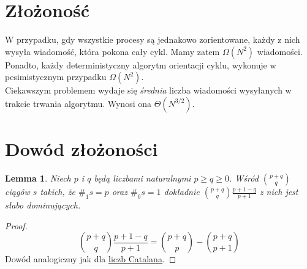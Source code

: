 \documentclass{article}
\newtheorem{lemma}[theorem]{Lemma}
\begin{document}
\section{Złożoność}
W przypadku, gdy wszystkie procesy są jednakowo zorientowane, każdy z nich wysyła wiadomość, która pokona cały cykl. Mamy zatem $\Omega(N^2)$ wiadomości.
Ponadto, każdy deterministyczny algorytm orientacji cyklu, wykonuje w pesimistycznym przypadku $\Omega(N^2)$.\\
Ciekawszym problemem wydaje się \textit{średnia} liczba wiadomości wysyłanych w trakcie trwania algorytmu.
Wynosi ona $\Theta(N^{3/2})$.

\section{Dowód złożoności}
\begin{lemma}
Niech $p$ i $q$ będą liczbami naturalnymi $p \ge q \ge 0$.
Wśród $p+q \choose q$ ciągów $s$ takich, że $\#_1 s = p$ oraz $\#_0 s = 1$ dokładnie ${p+q \choose q} \frac{p+1-q}{p+1}$ z nich jest słabo dominujących.
\end{lemma}
\begin{proof}
\[
{p+q \choose q} \frac{p+1-q}{p+1} = {p+q \choose p} - {p+q \choose p+1}
\]
Dowód analogiczny jak dla \href{https://www.youtube.com/watch?v=kaInaIUABzY}{liczb Catalana}.
\end{proof}
\end{document}
